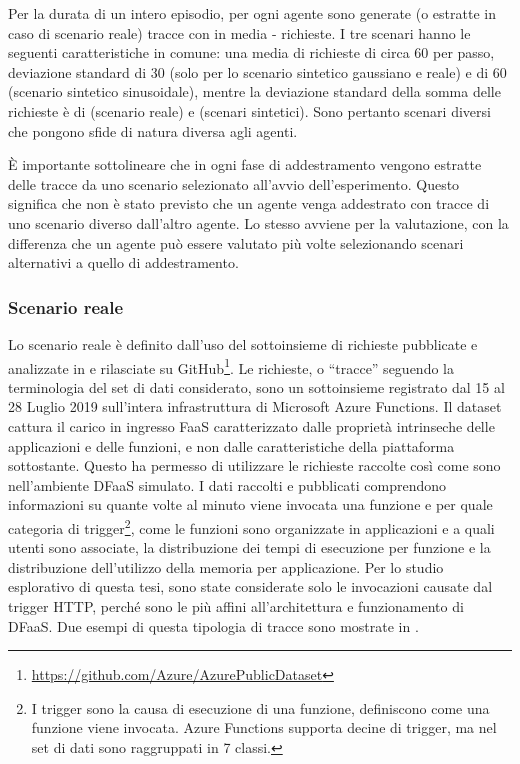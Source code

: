Per la durata di un intero episodio, per ogni agente sono generate (o estratte in caso di scenario reale) tracce con in media - richieste. I tre scenari hanno le seguenti caratteristiche in comune: una media di richieste di circa 60 per passo, deviazione standard di 30 (solo per lo scenario sintetico gaussiano e reale) e di 60 (scenario sintetico sinusoidale), mentre la deviazione standard della somma delle richieste è di  (scenario reale) e  (scenari sintetici). Sono pertanto scenari diversi che pongono sfide di natura diversa agli agenti.

È importante sottolineare che in ogni fase di addestramento vengono estratte delle tracce da uno scenario selezionato all'avvio dell'esperimento. Questo significa che non è stato previsto che un agente venga addestrato con tracce di uno scenario diverso dall'altro agente. Lo stesso avviene per la valutazione, con la differenza che un agente può essere valutato più volte selezionando scenari alternativi a quello di addestramento.

\subsubsection{Scenario reale}
\label{sec:5_scenario_reale}

Lo scenario reale è definito dall'uso del sottoinsieme di richieste pubblicate e analizzate in \cite{Shahrad2020} e rilasciate su GitHub\footnote{\url{https://github.com/Azure/AzurePublicDataset}}. Le richieste, o ``tracce'' seguendo la terminologia del set di dati considerato, sono un sottoinsieme registrato dal 15 al 28 Luglio 2019 sull'intera infrastruttura di Microsoft Azure Functions. Il dataset cattura il carico in ingresso FaaS caratterizzato dalle proprietà intrinseche delle applicazioni e delle funzioni, e non dalle caratteristiche della piattaforma sottostante. Questo ha permesso di utilizzare le richieste raccolte così come sono nell'ambiente DFaaS simulato. I dati raccolti e pubblicati comprendono informazioni su quante volte al minuto viene invocata una funzione e per quale categoria di trigger\footnote{I trigger sono la causa di esecuzione di una funzione, definiscono come una funzione viene invocata. Azure Functions supporta decine di trigger, ma nel set di dati sono raggruppati in 7 classi.}, come le funzioni sono organizzate in applicazioni e a quali utenti sono associate, la distribuzione dei tempi di esecuzione per funzione e la distribuzione dell'utilizzo della memoria per applicazione. Per lo studio esplorativo di questa tesi, sono state considerate solo le invocazioni causate dal trigger HTTP, perché sono le più affini all'architettura e funzionamento di DFaaS. Due esempi di questa tipologia di tracce sono mostrate in .

